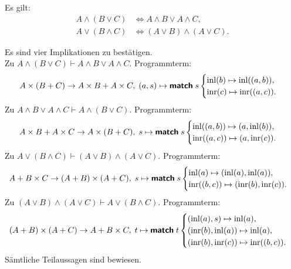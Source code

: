 \begin{Satz}[Distributivgesetze]%
\label{bool-dl}
Es gilt:
\begin{align*}
A\land (B\lor C) &\iff A\land B\lor A\land C,\\
A\lor (B\land C) &\iff (A\lor B)\land (A\lor C).
\end{align*}
\end{Satz}
\begin{Beweis} Es sind vier Implikationen zu bestätigen.\\
Zu $A\land (B\lor C) \vdash A\land B\lor A\land C$.
Programmterm:
\[A\times (B+C) \to A\times B + A\times C,\; (a, s)\mapsto \text{{\normalfont\sffamily\bfseries match}}\; s \begin{cases}
\operatorname{inl}(b)\mapsto \operatorname{inl}((a,b)),\\
\operatorname{inr}(c)\mapsto \operatorname{inr}((a,c)).
\end{cases}\]
Zu $A\land B\lor A\land C\vdash A\land (B\lor C)$.
Programmterm:
\[A\times B + A\times C\to A\times (B + C),\;
s\mapsto\text{{\normalfont\sffamily\bfseries match}}\; s\begin{cases}
\operatorname{inl}((a,b))\mapsto (a, \operatorname{inl}(b)),\\
\operatorname{inr}((a,c))\mapsto (a, \operatorname{inr}(c)).
\end{cases}
\]
Zu $A\lor (B\land C) \vdash (A\lor B)\land (A\lor C)$. Programmterm:
\[A+B\times C\to (A+B)\times (A+C),\;
s\mapsto\text{{\normalfont\sffamily\bfseries match}}\; s\begin{cases}
\operatorname{inl}(a)\mapsto (\operatorname{inl}(a),\operatorname{inl}(a)),\\
\operatorname{inr}((b,c))\mapsto (\operatorname{inr}(b),\operatorname{inr}(c)).
\end{cases} 
\]
Zu $(A\lor B)\land (A\lor C)\vdash A\lor (B\land C)$. Programmterm:
\[
(A+B)\times (A+C)\to A + B\times C,\;
t\mapsto\text{{\normalfont\sffamily\bfseries match}}\; t\begin{cases}
(\operatorname{inl}(a), s) \mapsto\operatorname{inl}(a),\\
(\operatorname{inr}(b), \operatorname{inl}(a)) \mapsto\operatorname{inl}(a),\\
(\operatorname{inr}(b), \operatorname{inr}(c)) \mapsto\operatorname{inr}((b, c)).
\end{cases}
\]
Sämtliche Teilaussagen sind bewiesen.\;\qedsymbol
\end{Beweis}

